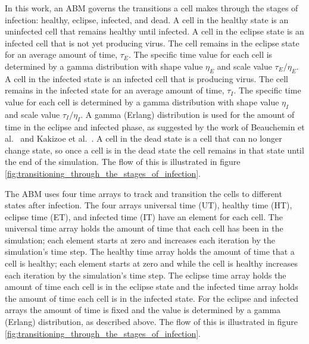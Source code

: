 In this work, an ABM governs the transitions a cell makes through the stages of infection: healthy, eclipse, infected, and dead. A cell in the healthy state is an uninfected cell that remains healthy until infected. A cell in the eclipse state is an infected cell that is not yet producing virus. The cell remains in the eclipse state for an average amount of time, $\tau_E$. The specific time value for each cell is determined by a gamma distribution with shape value $\eta_E$ and scale value $\tau_E/\eta_E$. A cell in the infected state is an infected cell that is producing virus. The cell remains in the infected state for an average amount of time, $\tau_I$. The specific time value for each cell is determined by a gamma distribution with shape value $\eta_I$ and scale value $\tau_I/\eta_I$. A gamma (Erlang) distribution is used for the amount of time in the eclipse and infected phase, as suggested by the work of Beauchemin et al.\ \citep{beauchemin17} and Kakizoe et al.\ \citep{kakizoe15}. A cell in the dead state is a cell that can no longer change state, so once a cell is in the dead state the cell remains in that state until the end of the simulation. The flow of this is illustrated in figure \ref{fig:transitioning_through_the_stages_of_infection}.

The ABM uses four time arrays to track and transition the cells to different states after infection. The four arrays universal time (UT), healthy time (HT), eclipse time (ET), and infected time (IT) have an element for each cell. The universal time array holds the amount of time that each cell has been in the simulation; each element starts at zero and increases each iteration by the simulation's time step. The healthy time array holds the amount of time that a cell is healthy; each element starts at zero and while the cell is healthy increases each iteration by the simulation's time step. The eclipse time array holds the amount of time each cell is in the eclipse state and the infected time array holds the amount of time each cell is in the infected state. For the eclipse and infected arrays the amount of time is fixed and the value is determined by a gamma (Erlang) distribution, as described above. The flow of this is illustrated in figure \ref{fig:transitioning_through_the_stages_of_infection}.

